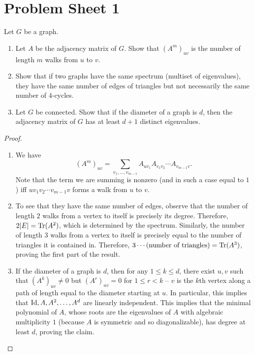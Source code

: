 \documentclass{article}
\begin{document}
\thispagestyle{empty}

\titleBC
\tableofcontents
\clearpage


\section{Problem Sheet 1}

	\begin{problem}
		
	\end{problem}

	\begin{solution*}

	\end{solution*}

	\begin{problem}
		Let $G$ be a graph.
		\begin{enumerate}[label=(\roman*)]
			\item Let $A$ be the adjacency matrix of $G$. Show that $(A^m)_{uv}$ is the number of length $m$ walks from $u$ to $v$.
			\item Show that if two graphs have the same spectrum (multiset of eigenvalues), they have the same number of edges of triangles but not necessarily the same number of $4$-cycles.
			\item Let $G$ be connected. Show that if the diameter of a graph is $d$, then the adjacency matrix of $G$ has at least $d+1$ distinct eigenvalues.
		\end{enumerate}
	\end{problem}
	\begin{proof}
		\begin{enumerate}[label=(\roman*)]
			\item We have
			\[ (A^m)_{uv} = \sum_{v_1,\ldots,v_{m-1}} A_{uv_1} A_{v_1v_2} \cdots A_{v_{m-1}v}. \]
			Note that the term we are summing is nonzero (and in such a case equal to $1$) iff $uv_1v_2\cdots v_{m-1}v$ forms a walk from $u$ to $v$.

			\item To see that they have the same number of edges, observe that the number of length $2$ walks from a vertex to itself is precisely its degree. Therefore, $2|E| = \operatorname{Tr}(A^2)$, which is determined by the spectrum. Similarly, the number of length $3$ walks from a vertex to itself is precisely equal to the number of triangles it is contained in. Therefore, $3\cdots (\text{number of triangles}) = \operatorname{Tr}(A^3)$, proving the first part of the result.\\

			\item If the diameter of a graph is $d$, then for any $1 \le k \le d$, there exist $u,v$ such that $(A^k)_{uv} \ne 0$ but $(A^r)_{uv} = 0$ for $1 \le r < k$ -- $v$ is the $k$th vertex along a path of length equal to the diameter starting at $u$. In particular, this implies that $\operatorname{Id},A,A^2,\ldots,A^d$ are linearly independent.	This implies that the minimal polynomial of $A$, whose roots are the eigenvalues of $A$ with algebraic multiplicity $1$ (because $A$ is symmetric and so diagonalizable), has degree at least $d$, proving the claim.
		\end{enumerate}
	\end{proof}
\end{document}
